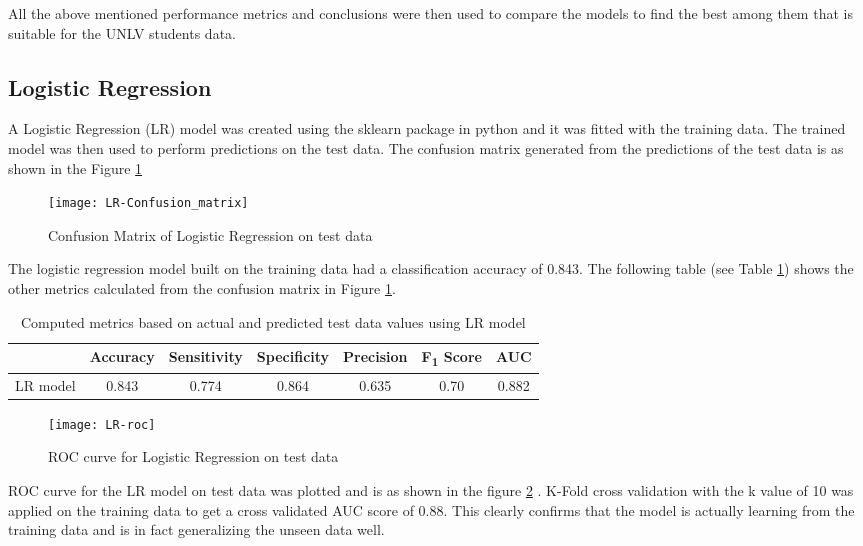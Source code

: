 \documentclass[11pt,openright]{report}
\begin{document}
All the above mentioned performance metrics and conclusions were then used to compare the models to find the best among them that is suitable for the UNLV students data.

\subsection {Logistic Regression}
A Logistic Regression (LR) model was created using the sklearn package in python and it was fitted with the training data. The trained model was then used to perform predictions on the test data. The confusion matrix generated from the predictions of the test data is as shown in the Figure \ref{fig:lr_confusion_matrix}

  \begin{figure}
	\centering
	\texttt{[image: LR-Confusion\_matrix]}
	\caption{Confusion Matrix of Logistic Regression on test data}
	\label{fig:lr_confusion_matrix}
\end{figure} 

The logistic regression model built on the training data had a classification accuracy of 0.843. The following table (see Table \ref{table:lr-metrics_db}) shows the other metrics calculated from the confusion matrix in Figure \ref{fig:lr_confusion_matrix}. 
\begin{table}
	\renewcommand{\arraystretch}{1.3}
	\caption{Computed metrics based on actual and predicted test data values using LR model}
	\label{table:lr-metrics_db}
	\centering
	\begin{tabular}{|c|c|c|c|c|c|c|}
    \hline
  	 & \bfseries Accuracy & \bfseries Sensitivity & \bfseries Specificity & \bfseries Precision & \bfseries F\textsubscript{1} Score  & \bfseries AUC\\  
    \hline
	LR model & 0.843 & 0.774 & 0.864 & 0.635 & 0.70 & 0.882 \\ \hline
	\end{tabular} 
\end{table}


 \begin{figure}[!htbp]
	\centering
	\texttt{[image: LR-roc]}
	\caption{ROC curve for Logistic Regression on test data}
	\label{fig:lr_roc}
\end{figure} 

ROC curve for the LR model on test data was plotted  and is as shown in the figure \ref{fig:lr_roc} . K-Fold cross validation with the k value of 10 was applied on the training data to get a cross validated AUC score of 0.88. This clearly confirms that the model is actually learning from the training data and is in fact generalizing the unseen data well.
\end{document}
